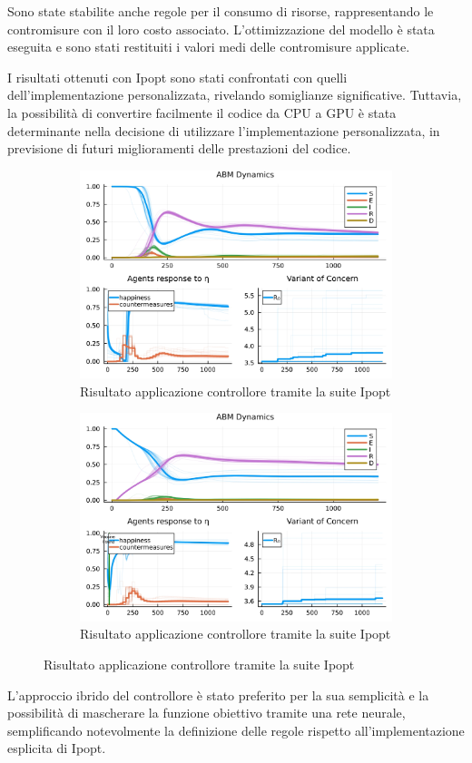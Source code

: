 Sono state stabilite anche regole per il consumo di risorse, 
rappresentando le contromisure con il loro costo associato. 
L'ottimizzazione del modello è stata eseguita e sono stati restituiti 
i valori medi delle contromisure applicate.

I risultati ottenuti con Ipopt sono stati confrontati con quelli 
dell'implementazione personalizzata, rivelando somiglianze 
significative. Tuttavia, la possibilità di convertire facilmente 
il codice da CPU a GPU è stata determinante nella decisione di 
utilizzare l'implementazione personalizzata, in previsione di futuri 
miglioramenti delle prestazioni del codice.

\begin{figure}[!hb]
	\centering
	\begin{subfigure}[b]{\textwidth}
		\centering
		\includegraphics[width=\textwidth]{img/SocialNetworkABM_IPOPT_CONTROL.jpg}
		\caption{Risultato applicazione controllore tramite la suite Ipopt}
		\label{fig:ipopt_res1}
	\end{subfigure}
	\hfill
	\begin{subfigure}[b]{\textwidth}
		\centering
		\includegraphics[width=\textwidth]{img/SocialNetworkABM_IPOPT_ALL.jpg}
		\caption{Risultato applicazione controllore tramite la suite Ipopt}
		\label{fig:ipopt_res2}
	\end{subfigure}
\end{figure}

L'approccio ibrido del controllore è stato preferito per la sua 
semplicità e la possibilità di mascherare la funzione obiettivo 
tramite una rete neurale, semplificando notevolmente la definizione 
delle regole rispetto all'implementazione esplicita di Ipopt.
